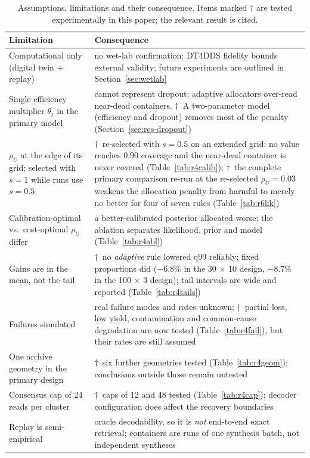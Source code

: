 \begin{table}[!b]
\centering
\caption{Assumptions, limitations and their consequence.  Items marked $\dagger$ are tested
experimentally in this paper; the relevant result is cited.}
\label{tab:limits}
\scriptsize
\begin{tabular}{@{}p{31mm}p{47mm}@{}}
\toprule
Limitation & Consequence \\
\midrule
Computational only (digital twin + replay) & no wet-lab confirmation; DT4DDS fidelity bounds external validity; future experiments are outlined in Section~\ref{sec:wetlab} \\
Single efficiency multiplier $\theta_j$ in the primary model & cannot represent dropout; adaptive allocators over-read near-dead containers.  $\dagger$~A two-parameter model (efficiency and dropout) removes most of the penalty (Section~\ref{sec:res-dropout}) \\
$\rho_U$ at the edge of its grid; selected with $s{=}1$ while runs use $s{=}0.5$ & $\dagger$~re-selected with $s{=}0.5$ on an extended grid: no value reaches 0.90 coverage and the near-dead container is never covered (Table~\ref{tab:r4calib}); $\dagger$~the complete primary comparison re-run at the re-selected $\rho_U{=}0.03$ weakens the allocation penalty from harmful to merely no better for four of seven rules (Table~\ref{tab:r6lik}) \\
Calibration-optimal vs.\ cost-optimal $\rho_U$ differ & a better-calibrated posterior allocated worse; the ablation separates likelihood, prior and model (Table~\ref{tab:r4abl}) \\
Gains are in the mean, not the tail & $\dagger$~no \emph{adaptive} rule lowered q99 reliably; fixed proportions did ($-$6.8\% in the 30 $\times$ 10 design, $-$8.7\% in the 100 $\times$ 3 design); tail intervals are wide and reported (Table~\ref{tab:r4tails}) \\
Failures simulated & real failure modes and rates unknown; $\dagger$~partial loss, low yield, contamination and common-cause degradation are now tested (Table~\ref{tab:r4fail}), but their rates are still assumed \\
One archive geometry in the primary design & $\dagger$~six further geometries tested (Table~\ref{tab:r4geom}); conclusions outside those remain untested \\
Consensus cap of 24 reads per cluster & $\dagger$~caps of 12 and 48 tested (Table~\ref{tab:r4cap}); decoder configuration does affect the recovery boundaries \\
Replay is semi-empirical & oracle decodability, so it is \emph{not} end-to-end exact retrieval; containers are runs of one synthesis batch, not independent syntheses \\

\end{tabular}
\end{table}
